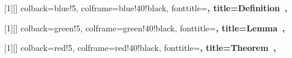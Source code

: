 \usepackage{tcolorbox}
\usepackage{hyperref}
\usepackage{geometry}
\usepackage{tikz}
\usepackage{pgfplots}
\usepackage{booktabs}
\usepackage{amssymb}
\usepackage{xparse}
\usepackage{eucal}


\pgfplotsset{compat=1.18}

[1][]{%
  colback=blue!5,
  colframe=blue!40!black,
  fonttitle=\bfseries,
  title={Definition~\thetcbcounter{}},
}

[1][]{%
  colback=green!5,
  colframe=green!40!black,
  fonttitle=\bfseries,
  title={Lemma~\thetcbcounter{}},
}

[1][]{%
  colback=red!5,
  colframe=red!40!black,
  fonttitle=\bfseries,
  title={Theorem~\thetcbcounter{}},
}

\newtheorem{corollary}[section]{Corollary}
\newtheorem{exercise}[section]{Exercise}

\newtheorem*{remark}{Remark}